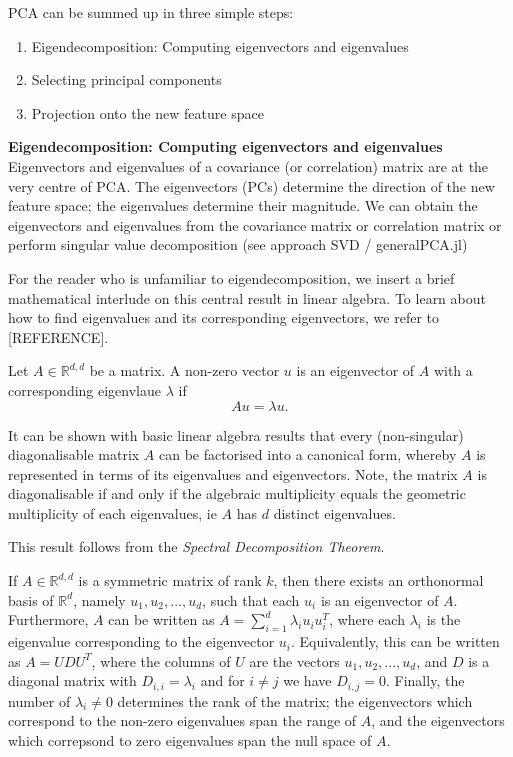 PCA can be summed up in three simple steps:
\begin{enumerate}
	\item Eigendecomposition: Computing eigenvectors and eigenvalues
	\item Selecting principal components
	\item Projection onto the new feature space
\end{enumerate}
%
\textbf{Eigendecomposition: Computing eigenvectors and eigenvalues}\\
Eigenvectors and eigenvalues of a covariance (or correlation) matrix are at the very centre of PCA. The eigenvectors (PCs) determine the direction of the new feature space; the eigenvalues determine their magnitude. 
We can obtain the eigenvectors and eigenvalues from the covariance matrix or correlation matrix or perform singular value decomposition (see approach SVD / generalPCA.jl)

For the reader who is unfamiliar to eigendecomposition, we insert a brief mathematical interlude on this central result in linear algebra. To learn about how to find eigenvalues and its corresponding eigenvectors, we refer to [REFERENCE].

Let \( A \in \mathbb{R}^{d,d}\) be a matrix. A non-zero vector \( u \) is an eigenvector of \( A \) with a corresponding eigenvlaue \( \lambda \) if 
\begin{equation}
	A u = \lambda u .
\end{equation}

It can be shown with basic linear algebra results that every (non-singular) diagonalisable matrix \( A \) can be factorised into a canonical form, whereby \( A \) is represented in terms of its eigenvalues and eigenvectors.
Note, the matrix \( A \) is diagonalisable if and only if the algebraic multiplicity equals the geometric multiplicity of each eigenvalues, ie \( A \) has \( d \) distinct eigenvalues.

This result follows from the \textit{Spectral Decomposition Theorem}. 
\begin{theorem}\label{spectralthm}
	If \( A \in \mathbb{R}^{d,d}\) is a symmetric matrix of rank \( k \), then there exists an orthonormal basis of \( \mathbb{R}^d \), namely \( u_{1}, u_{2}, ..., u_{d} \), such that each \( u_{i} \) is an eigenvector of \( A \). Furthermore, \( A \) can be written as \( A = \sum_{i=1}^{d} \lambda_{i} u_{i} u_{i}^T \), where each \( \lambda_{i} \) is the eigenvalue corresponding to the eigenvector \( u_{i} \). Equivalently, this can be written as \( A = U D U^T \), where the columns of \( U \) are the vectors \( u_{1}, u_{2}, ..., u_{d} \), and \( D \) is a diagonal matrix with \( D_{i,i} = \lambda_{i} \) and for \( i \neq j \) we have \( D_{i,j} = 0 \). Finally, the number of \( \lambda_{i} \neq 0 \) determines the rank of the matrix; the eigenvectors which correspond to the non-zero eigenvalues span the range of \( A \), and the eigenvectors which correpsond to zero eigenvalues span the null space of \( A \).
\end{theorem}

